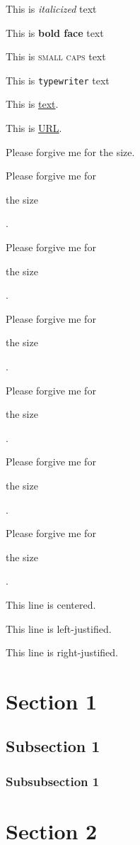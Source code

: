 \documentclass[12pt,a4paper]{article}
\begin{document}
This is \textit{italicized} text

This is \textbf{bold face} text

This is \textsc{small caps} text

This is \texttt{typewriter} text

This is  \href{URL}{text}.

This is \url{URL}.

Please forgive me for the size.

Please forgive me for \begin{large}the size\end{large}.

Please forgive me for \begin{Large}the size\end{Large}.

Please forgive me for \begin{huge}the size\end{huge}.

Please forgive me for \begin{Huge}the size\end{Huge}.

Please forgive me for \begin{small}the size\end{small}.

Please forgive me for \begin{tiny}the size\end{tiny}.

\begin{center} This line is centered. \end{center}

\begin{flushleft} This line is left-justified. \end{flushleft}

\begin{flushright} This line is right-justified. \end{flushright}

\section{Section 1}
\subsection{Subsection 1}
\subsubsection{Subsubsection 1}
\section{Section 2}
\end{document}

